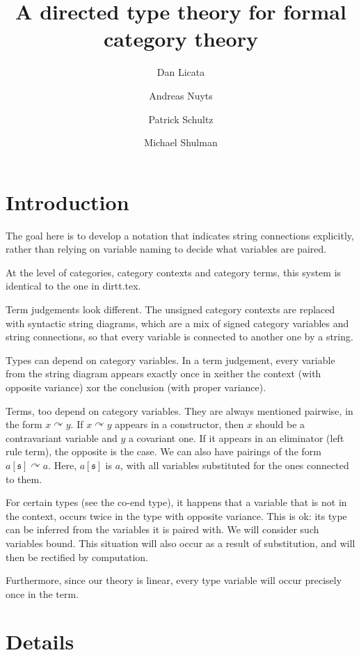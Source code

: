 \documentclass{article}
\title{A directed type theory for formal category theory}
\author{Dan Licata \and Andreas Nuyts \and Patrick Schultz \and Michael Shulman}
\newcommand{\strs}[1]{\mathfrak{#1}}
\newcommand{\strto}{\curvearrowright}
\begin{document}
\maketitle

\section{Introduction}
The goal here is to develop a notation that indicates string connections explicitly, rather than relying on variable naming to decide what variables are paired.

At the level of categories, category contexts and category terms, this system is identical to the one in dirtt.tex.

Term judgements look different. The unsigned category contexts are replaced with syntactic string diagrams, which are a mix of signed category variables and string connections, so that every variable is connected to another one by a string.

Types can depend on category variables. In a term judgement, every variable from the string diagram appears exactly once in xeither the context (with opposite variance) xor the conclusion (with proper variance).

Terms, too depend on category variables. They are always mentioned pairwise, in the form $x \strto y$. If $x \strto y$ appears in a constructor, then $x$ should be a contravariant variable and $y$ a covariant one. If it appears in an eliminator (left rule term), the opposite is the case. We can also have pairings of the form $a[\strs s] \strto a$. Here, $a[\strs s]$ is $a$, with all variables substituted for the ones connected to them.

For certain types (see the co-end type), it happens that a variable that is not in the context, occurs twice in the type with opposite variance. This is ok: its type can be inferred from the variables it is paired with. We will consider such variables bound. This situation will also occur as a result of substitution, and will then be rectified by computation.

Furthermore, since our theory is linear, every type variable will occur precisely once in the term.

\section{Details}
\end{document}
